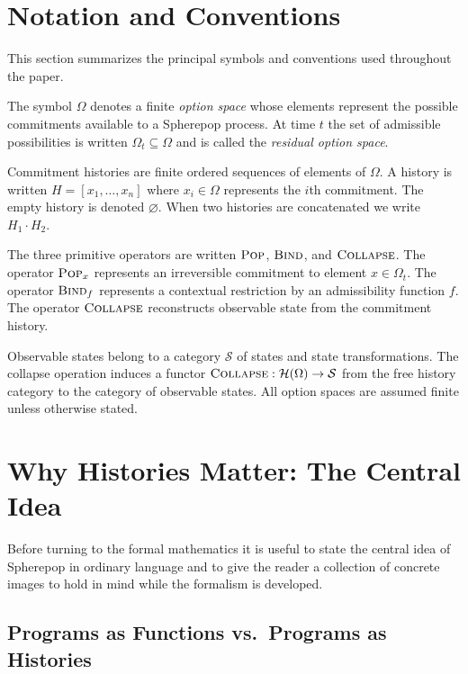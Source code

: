 \documentclass[12pt]{article}
\newcommand{\Pop}{\operatorname{\textsc{Pop}}}
\newcommand{\Bind}{\operatorname{\textsc{Bind}}}
\newcommand{\Collapse}{\operatorname{\textsc{Collapse}}}
\newcommand{\History}{\mathcal{H}}
\newcommand{\Option}{\Omega}
\newcommand{\State}{\mathcal{S}}
\newcommand{\Seq}[1]{\left[#1\right]}
\newcommand{\Append}{\mathbin{\cdot}}
\begin{document}
\section{Notation and Conventions}
\label{sec:notation}

This section summarizes the principal symbols and conventions used throughout the paper.

The symbol $\Option$ denotes a finite \emph{option space} whose elements represent the possible commitments available to a Spherepop process. At time $t$ the set of admissible possibilities is written $\Option_t \subseteq \Option$ and is called the \emph{residual option space}.

Commitment histories are finite ordered sequences of elements of $\Option$. A history is written $H = \Seq{x_1,\dots,x_n}$ where $x_i \in \Option$ represents the $i$th commitment. The empty history is denoted $\varnothing$. When two histories are concatenated we write $H_1 \Append H_2$.

The three primitive operators are written $\Pop$, $\Bind$, and $\Collapse$. The operator $\Pop_x$ represents an irreversible commitment to element $x \in \Option_t$. The operator $\Bind_f$ represents a contextual restriction by an admissibility function $f$. The operator $\Collapse$ reconstructs observable state from the commitment history.

Observable states belong to a category $\State$ of states and state transformations. The collapse operation induces a functor $\Collapse : \History(\Option) \to \State$ from the free history category to the category of observable states. All option spaces are assumed finite unless otherwise stated.

\section{Why Histories Matter: The Central Idea}
\label{sec:intuition}

Before turning to the formal mathematics it is useful to state the central idea of Spherepop in ordinary language and to give the reader a collection of concrete images to hold in mind while the formalism is developed.

\subsection{Programs as Functions vs.\ Programs as Histories}
\end{document}
